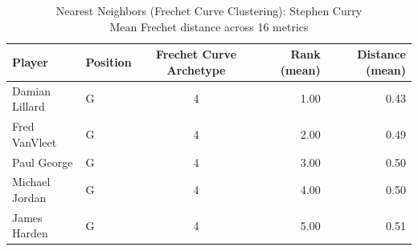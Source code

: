 \begin{table}[t]
\caption*{
{\fontsize{20}{25} Nearest Neighbors (Frechet Curve Clustering): Stephen Curry\fontsize{12}{15}\selectfont } \\ 
{\fontsize{14}{17}\selectfont  Mean Frechet distance across 16 metrics\fontsize{12}{15}\selectfont }
} 
\fontsize{12.0pt}{14.0pt}\selectfont
\begin{tabular*}{\linewidth}{@{\extracolsep{\fill}}llcrr}
\toprule
Player & Position & Frechet Curve Archetype & Rank (mean) & Distance (mean) \\ 
\midrule\addlinespace[2.5pt]
Damian Lillard & G & 4 & 1.00 & 0.43 \\ 
Fred VanVleet & G & 4 & 2.00 & 0.49 \\ 
Paul George & G & 4 & 3.00 & 0.50 \\ 
Michael Jordan & G & 4 & 4.00 & 0.50 \\ 
James Harden & G & 4 & 5.00 & 0.51 \\ 
\bottomrule
\end{tabular*}
\end{table}

